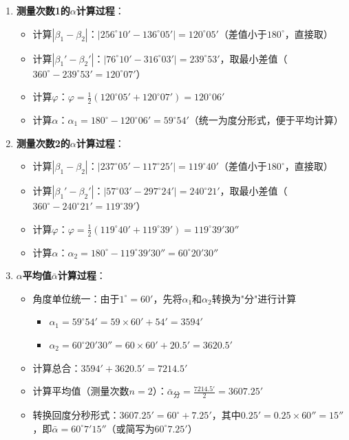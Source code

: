 \documentclass[11pt]{article}
\begin{document}
\begin{enumerate}[itemsep=0.5ex, labelsep=0.5em]
  \item \textbf{测量次数1的$\alpha$计算过程}：
  \begin{itemize}[itemsep=0.3ex, leftmargin=1.5em]
    \item 计算$|\beta_1 - \beta_2|$：$|256^\circ10' - 136^\circ05'| = 120^\circ05'$（差值小于$180^\circ$，直接取）
    \item 计算$|\beta_1' - \beta_2'|$：$|76^\circ10' - 316^\circ03'| = 239^\circ53'$，取最小差值（$360^\circ - 239^\circ53' = 120^\circ07'$）
    \item 计算$\varphi$：$\varphi = \frac{1}{2}\left(120^\circ05' + 120^\circ07'\right) = 120^\circ06'$
    \item 计算$\alpha$：$\alpha_1 = 180^\circ - 120^\circ06' = 59^\circ54'$（统一为度分形式，便于平均计算）
  \end{itemize}

  \item \textbf{测量次数2的$\alpha$计算过程}：
  \begin{itemize}[itemsep=0.3ex, leftmargin=1.5em]
    \item 计算$|\beta_1 - \beta_2|$：$|237^\circ05' - 117^\circ25'| = 119^\circ40'$（差值小于$180^\circ$，直接取）
    \item 计算$|\beta_1' - \beta_2'|$：$|57^\circ03' - 297^\circ24'| = 240^\circ21'$，取最小差值（$360^\circ - 240^\circ21' = 119^\circ39'$）
    \item 计算$\varphi$：$\varphi = \frac{1}{2}\left(119^\circ40' + 119^\circ39'\right) = 119^\circ39'30''$
    \item 计算$\alpha$：$\alpha_2 = 180^\circ - 119^\circ39'30'' = 60^\circ20'30''$
  \end{itemize}

  \item \textbf{$\alpha$平均值$\bar{\alpha}$计算过程}：
  \begin{itemize}[itemsep=0.3ex, leftmargin=1.5em]
    \item 角度单位统一：由于$1^\circ = 60'$，先将$\alpha_1$和$\alpha_2$转换为"分"进行计算
      \begin{itemize}[leftmargin=1em, itemsep=0.2ex]
        \item $\alpha_1 = 59^\circ54' = 59 \times 60' + 54' = 3594'$
        \item $\alpha_2 = 60^\circ20'30'' = 60 \times 60' + 20.5' = 3620.5'$
      \end{itemize}
    \item 计算总合：$3594' + 3620.5' = 7214.5'$
    \item 计算平均值（测量次数$n=2$）：$\bar{\alpha}_{\text{分}} = \frac{7214.5'}{2} = 3607.25'$
    \item 转换回度分秒形式：$3607.25' = 60^\circ + 7.25'$，其中$0.25' = 0.25 \times 60'' = 15''$，即$\bar{\alpha} = 60^\circ7'15''$（或简写为$60^\circ7.25'$）
  \end{itemize}
\end{enumerate}
\end{document}
